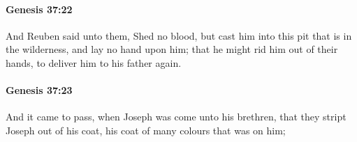 		\paragraph{Genesis 37:22} %
			\label{GENESIS-37-22}

			And Reuben said unto them, Shed no blood, but cast him into this pit that is in the wilderness, and lay no hand upon him; that he might rid him out of their hands, to deliver him to his father again.


		\paragraph{Genesis 37:23} %
			\label{GENESIS-37-23}

			And it came to pass, when Joseph was come unto his brethren, that they stript Joseph out of his coat, his coat of many colours that was on him;


